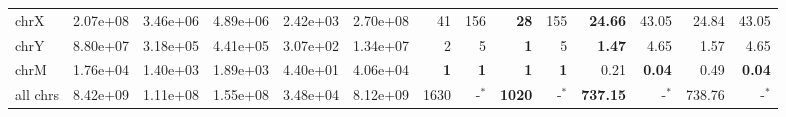 \begin{table*}[!ht]
\begin{tabular}{@{}lrrrrrrrrrrrrr@{}}
		chrX & 2.07e+08 & 3.46e+06 & 4.89e+06 & 2.42e+03 & 2.70e+08 & 41 & 156 & \textbf{28} & 155 & \textbf{24.66} & 43.05 & 24.84 & 43.05 \\ 
		chrY & 8.80e+07 & 3.18e+05 & 4.41e+05 & 3.07e+02 & 1.34e+07 & 2 & 5 & \textbf{1} & 5 & \textbf{1.47} & 4.65 & 1.57 & 4.65 \\ 
		chrM & 1.76e+04 & 1.40e+03 & 1.89e+03 & 4.40e+01 & 4.06e+04 & \textbf{1} & \textbf{1} & \textbf{1} & \textbf{1} & 0.21 & \textbf{0.04} & 0.49 & \textbf{0.04}  \\ 
		all chrs & 8.42e+09 & 1.11e+08 & 1.55e+08 & 3.48e+04 & 8.12e+09 & 1630 & -$^{*}$ & \textbf{1020} & -$^{*}$  & \textbf{737.15} & -$^{*}$ & 738.76 & -$^{*}$ \\
		\bottomrule
	\end{tabular}
\end{table*}